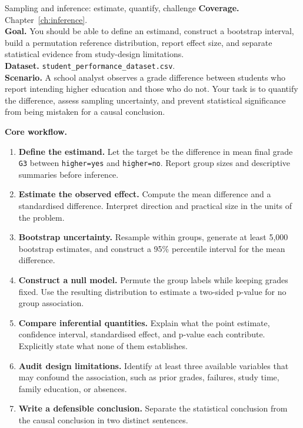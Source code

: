 
\begin{labproject}{Sampling and inference: estimate, quantify, challenge}
\textbf{Coverage.} Chapter~\ref{ch:inference}.\\
\textbf{Goal.} You should be able to define an estimand, construct a bootstrap interval, build a permutation reference distribution, report effect size, and separate statistical evidence from study-design limitations.\\
\textbf{Dataset.} \texttt{student\_performance\_dataset.csv}.\\
\textbf{Scenario.} A school analyst observes a grade difference between students who report intending higher education and those who do not. Your task is to quantify the difference, assess sampling uncertainty, and prevent statistical significance from being mistaken for a causal conclusion.

\textbf{Core workflow.}
\begin{enumerate}
  \item \textbf{Define the estimand.} Let the target be the difference in mean final grade \texttt{G3} between \texttt{higher=yes} and \texttt{higher=no}. Report group sizes and descriptive summaries before inference.
  \item \textbf{Estimate the observed effect.} Compute the mean difference and a standardised difference. Interpret direction and practical size in the units of the problem.
  \item \textbf{Bootstrap uncertainty.} Resample within groups, generate at least 5,000 bootstrap estimates, and construct a 95\% percentile interval for the mean difference.
  \item \textbf{Construct a null model.} Permute the group labels while keeping grades fixed. Use the resulting distribution to estimate a two-sided p-value for no group association.
  \item \textbf{Compare inferential quantities.} Explain what the point estimate, confidence interval, standardised effect, and p-value each contribute. Explicitly state what none of them establishes.
  \item \textbf{Audit design limitations.} Identify at least three available variables that may confound the association, such as prior grades, failures, study time, family education, or absences.
  \item \textbf{Write a defensible conclusion.} Separate the statistical conclusion from the causal conclusion in two distinct sentences.
\end{enumerate}


\end{labproject}
